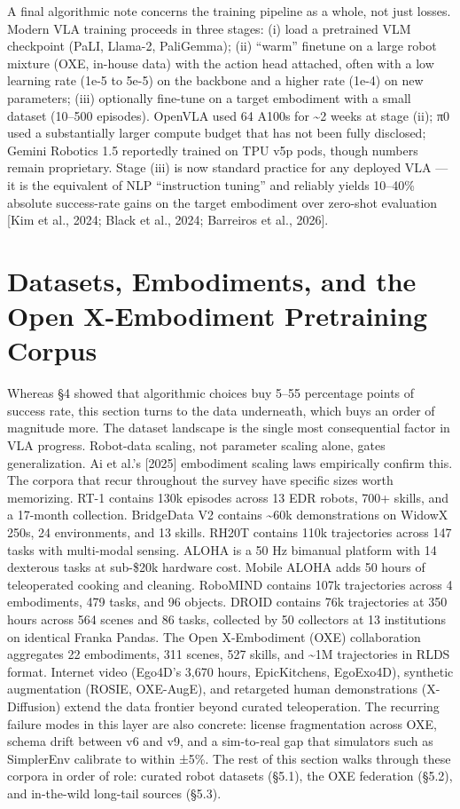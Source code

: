 A final algorithmic note concerns the training pipeline as a whole, not just losses. Modern VLA training proceeds in three stages: (i) load a pretrained VLM checkpoint (PaLI, Llama-2, PaliGemma); (ii) ``warm'' finetune on a large robot mixture (OXE, in-house data) with the action head attached, often with a low learning rate (1e-5 to 5e-5) on the backbone and a higher rate (1e-4) on new parameters; (iii) optionally fine-tune on a target embodiment with a small dataset (10--500 episodes). OpenVLA used 64 A100s for \textasciitilde2 weeks at stage (ii); π0 used a substantially larger compute budget that has not been fully disclosed; Gemini Robotics 1.5 reportedly trained on TPU v5p pods, though numbers remain proprietary. Stage (iii) is now standard practice for any deployed VLA --- it is the equivalent of NLP ``instruction tuning'' and reliably yields 10--40\% absolute success-rate gains on the target embodiment over zero-shot evaluation {[}Kim et al., 2024; Black et al., 2024; Barreiros et al., 2026{]}.

\section{Datasets, Embodiments, and the Open X-Embodiment Pretraining Corpus}\label{datasets-embodiments-and-the-open-x-embodiment-pretraining-corpus}

Whereas §4 showed that algorithmic choices buy 5--55 percentage points of success rate, this section turns to the data underneath, which buys an order of magnitude more. The dataset landscape is the single most consequential factor in VLA progress. Robot-data scaling, not parameter scaling alone, gates generalization. Ai et al.'s {[}2025{]} embodiment scaling laws empirically confirm this. The corpora that recur throughout the survey have specific sizes worth memorizing. RT-1 contains 130k episodes across 13 EDR robots, 700+ skills, and a 17-month collection. BridgeData V2 contains \textasciitilde60k demonstrations on WidowX 250s, 24 environments, and 13 skills. RH20T contains 110k trajectories across 147 tasks with multi-modal sensing. ALOHA is a 50 Hz bimanual platform with 14 dexterous tasks at sub-\$20k hardware cost. Mobile ALOHA adds 50 hours of teleoperated cooking and cleaning. RoboMIND contains 107k trajectories across 4 embodiments, 479 tasks, and 96 objects. DROID contains 76k trajectories at 350 hours across 564 scenes and 86 tasks, collected by 50 collectors at 13 institutions on identical Franka Pandas. The Open X-Embodiment (OXE) collaboration aggregates 22 embodiments, 311 scenes, 527 skills, and \textasciitilde1M trajectories in RLDS format. Internet video (Ego4D's 3,670 hours, EpicKitchens, EgoExo4D), synthetic augmentation (ROSIE, OXE-AugE), and retargeted human demonstrations (X-Diffusion) extend the data frontier beyond curated teleoperation. The recurring failure modes in this layer are also concrete: license fragmentation across OXE, schema drift between v6 and v9, and a sim-to-real gap that simulators such as SimplerEnv calibrate to within ±5\%. The rest of this section walks through these corpora in order of role: curated robot datasets (§5.1), the OXE federation (§5.2), and in-the-wild long-tail sources (§5.3).

